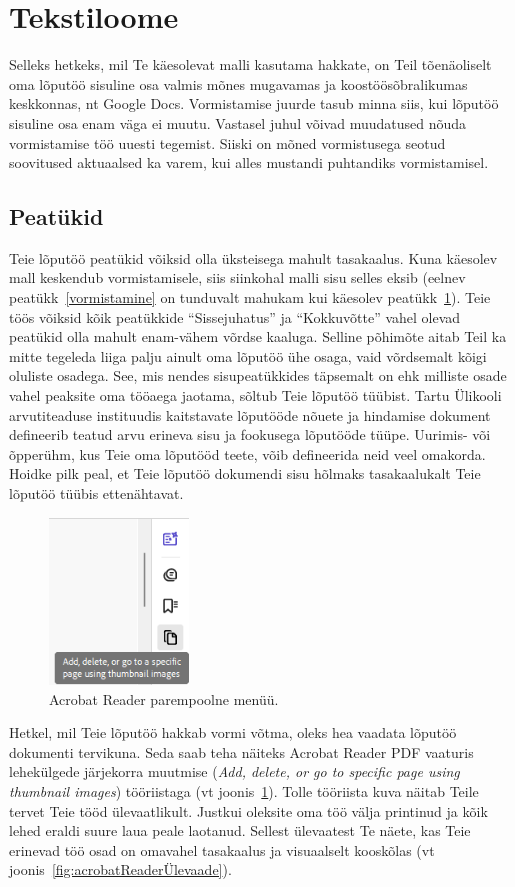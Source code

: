 \section{Tekstiloome} \label{tekstiloome}
Selleks hetkeks, mil Te käesolevat malli kasutama hakkate, on Teil tõenäoliselt oma lõputöö sisuline osa valmis mõnes mugavamas ja koostöösõbralikumas keskkonnas, nt Google Docs. Vormistamise juurde tasub minna siis, kui lõputöö sisuline osa enam väga ei muutu. Vastasel juhul võivad muudatused nõuda vormistamise töö uuesti tegemist. Siiski on mõned vormistusega seotud soovitused aktuaalsed ka varem, kui alles mustandi puhtandiks vormistamisel.

\subsection{Peatükid}
Teie lõputöö peatükid võiksid olla üksteisega mahult tasakaalus. Kuna käesolev mall keskendub vormistamisele, siis siinkohal malli sisu selles eksib (eelnev peatükk~\ref{vormistamine} on tunduvalt mahukam kui käesolev peatükk~\ref{tekstiloome}). Teie töös võiksid kõik peatükkide “Sissejuhatus” ja “Kokkuvõtte” vahel olevad peatükid olla mahult enam-vähem võrdse kaaluga. Selline põhimõte aitab Teil ka mitte tegeleda liiga palju ainult oma lõputöö ühe osaga, vaid võrdsemalt kõigi oluliste osadega. See, mis nendes sisupeatükkides täpsemalt on ehk milliste osade vahel peaksite oma tööaega jaotama, sõltub Teie lõputöö tüübist. Tartu Ülikooli arvutiteaduse instituudis kaitstavate lõputööde nõuete ja hindamise dokument defineerib teatud arvu erineva sisu ja fookusega lõputööde tüüpe. Uurimis- või õpperühm, kus Teie oma lõputööd teete, võib defineerida neid veel omakorda. Hoidke pilk peal, et Teie lõputöö dokumendi sisu hõlmaks tasakaalukalt Teie lõputöö tüübis ettenähtavat.

\begin{figure}
    \centering
    \includegraphics[width=0.33\textwidth]{joonised/Joonis5-AcrobatReaderMenüü.png}
    \caption{Acrobat Reader parempoolne menüü.}
    \label{fig:acrobatReaderMenüü}
\end{figure}
Hetkel, mil Teie lõputöö hakkab vormi võtma, oleks hea vaadata lõputöö dokumenti tervikuna. Seda saab teha näiteks Acrobat Reader PDF vaaturis lehekülgede järjekorra muutmise (\emph{Add, delete, or go to specific page using thumbnail images}) tööriistaga (vt joonis~\ref{fig:acrobatReaderMenüü}). Tolle tööriista kuva näitab Teile tervet Teie tööd ülevaatlikult. Justkui oleksite oma töö välja printinud ja kõik lehed eraldi suure laua peale laotanud. Sellest ülevaatest Te näete, kas Teie erinevad töö osad on omavahel tasakaalus ja visuaalselt kooskõlas (vt joonis~\ref{fig:acrobatReaderÜlevaade}).

